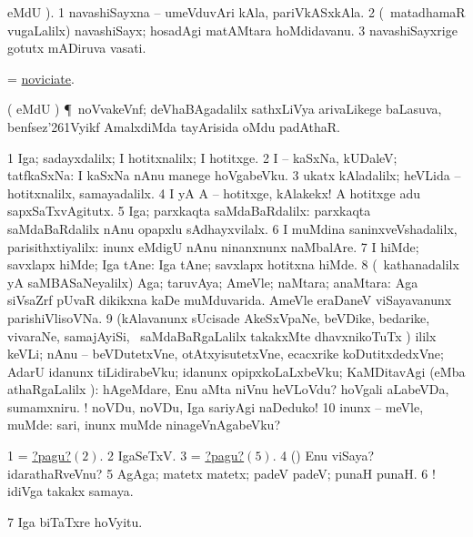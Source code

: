 \bentry
{}
\gl{\nA}
\bmng
{} eMdU \parx). 
\bnum
\num{1} navashiSayxna -- umeVduvAri kAla, pariVkASxkAla. 
\num{2} (\kanmu\ matadhamaR \mo vugaLalilx) navashiSayx; hosadAgi matAMtara hoMdidavanu. 
\num{3} navashiSayxrige gotutx mADiruva vasati. 
\enum
\emng
\eentry

\bentry
{}
\gl{\nA}
\bmng
= \hyperlink{noviciate}{noviciate}. 
\emng
\eentry

\bentry
{}
\gl{\nA}
\bmng
( eMdU \parx) \P\ noVvakeVnf; deVhaBAgadalilx sathxLiVya arivaLikege baLasuva, benfsez\char'261Vyikf AmalxdiMda tayArisida oMdu padAthaR. 
\emng
\eentry

\bentry
{}
\gl{\kirxvi}
\bmng
\bnum
\num{1} Iga; sadayxdalilx; I hotitxnalilx; I hotitxge. 
\num{2} I -- kaSxNa, kUDaleV; tatfkaSxNa:  I kaSxNa nAnu manege hoVgabeVku. 
\num{3} ukatx kAladalilx; heVLida -- hotitxnalilx, samayadalilx. 
\num{4} I yA A -- hotitxge, kAlakekx!  A hotitxge adu sapxSaTxvAgitutx. 
\num{5} Iga; parxkaqta saMdaBaRdalilx:  parxkaqta saMdaBaRdalilx nAnu opapxlu sAdhayxvilalx. 
\num{6} I muMdina saninxveVshadalilx, parisithxtiyalilx:  inunx eMdigU nAnu ninanxnunx naMbalAre. 
\num{7} I hiMde; savxlapx hiMde; Iga tAne:  Iga tAne; savxlapx hotitxna hiMde. 
\num{8} (\kanmu\ kathanadalilx yA saMBASaNeyalilx) Aga; taruvAya; AmeVle; naMtara; anaMtara:  Aga siVsaZrf pUvaR dikikxna kaDe muMduvarida.  AmeVle eraDaneV viSayavanunx parishiVlisoVNa. 
\num{9} (kAlavanunx sUcisade AkeSxVpaNe, beVDike, bedarike, vivaraNe, samajAyiSi, \mo\ saMdaBaRgaLalilx takakxMte dhavxnikoTuTx \parx) ililx keVLi; nAnu -- beVDutetxVne, otAtxyisutetxVne, ecacxrike koDutitxdedxVne; AdarU idanunx tiLidirabeVku; idanunx opipxkoLaLxbeVku; KaMDitavAgi (eMba athaRgaLalilx \parx):  hAgeMdare, Enu aMta niVnu heVLoVdu?  hoVgali aLabeVDa, sumamxniru. ! noVDu, noVDu, Iga sariyAgi naDeduko! 
\num{10} inunx -- meVle, muMde:  sari, inunx muMde ninageVnAgabeVku? 
\enum
\emng

\noindent
\gl{\pagu}
\bmng
\bnum
\num{1}  = \hyperlink{nowpagu2}{?pagu?\((2)\)}. 
\hypertarget{nowpagu2}{} 
\num{2}  IgaSeTxV. 
\num{3}  = \hyperlink{nowpagu5}{?pagu?\((5)\)}. 
\num{4} (\pArxparx) Enu viSaya? idarathaRveVnu? 
\hypertarget{nowpagu5}{} 
\num{5}  AgAga; matetx matetx; padeV padeV; punaH punaH. 
\num{6} ! idiVga takakx samaya. 
\hypertarget{now(1) pagu(7)}{} 
\num{7}  Iga biTaTxre hoVyitu. 
\enum
\emng
\eentry 

